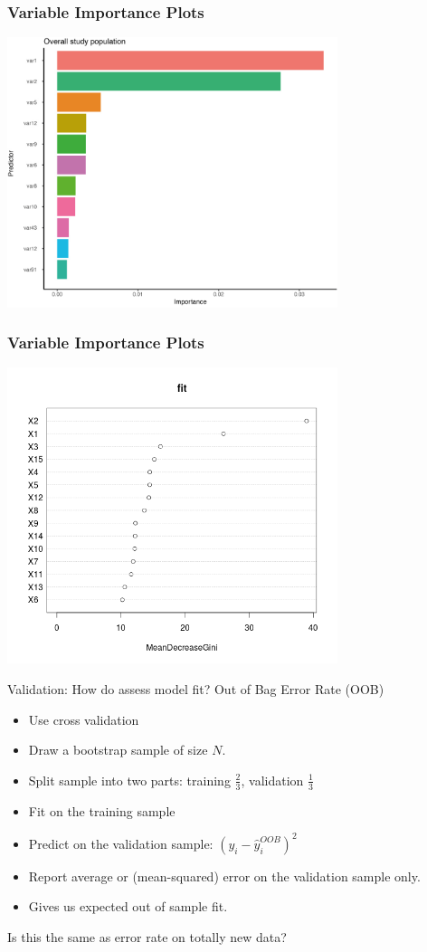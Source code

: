 \documentclass[xcolor=pdftex,dvipsnames,table,mathserif,aspectratio=169]{beamer}
\begin{document}
\begin{frame}
\frametitle{Variable Importance Plots}
\includegraphics[width=3.8in]{./resources/Importance.jpg}
\end{frame}

\begin{frame}
\frametitle{Variable Importance Plots}
\includegraphics[width=3.8in]{./resources/variable-importance.png}
\end{frame}


\begin{frame}{Validation: How do assess model fit?}
Out of Bag Error Rate (OOB)
\begin{itemize}
\item Use \alert{cross validation}
\item Draw a bootstrap sample of size $N$.
\item Split sample into two parts: training $\frac{2}{3}$, validation $\frac{1}{3}$
\item Fit on the training sample
\item Predict on the validation sample: $(y_i - \hat{y}_i^{OOB})^2$
\item Report average or (mean-squared) error on the validation sample only.
\item Gives us expected out of sample fit.
\end{itemize}
Is this the same as error rate on totally new data?
\end{frame}
\end{document}
